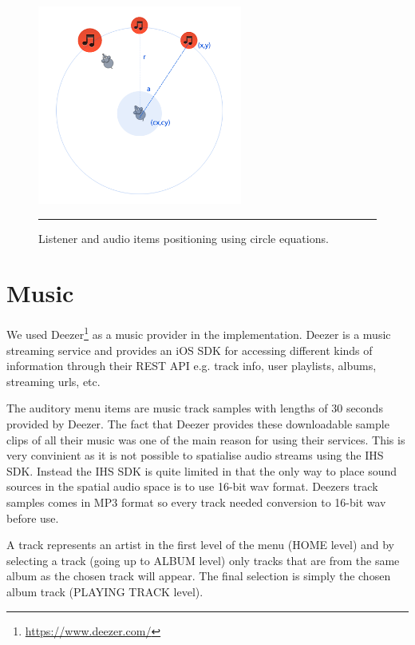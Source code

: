 \begin{figure}[t]
	\centering
		\includegraphics[width=0.6\textwidth,height=\textheight,keepaspectratio]{./Figures/circlepositions.png}
		\rule{35em}{1pt}
	\caption[Audio items positioning]{Listener and audio items positioning using circle equations.}
	\label{fig:circlepositions}
\end{figure}


\section{Music}
\label{sec:implementationmusic}
We used Deezer\footnote{\url{https://www.deezer.com/}} as a music provider in the implementation. Deezer is a music streaming service and provides an iOS SDK for accessing different kinds of information through their REST API e.g. track info, user playlists, albums, streaming urls, etc.

The auditory menu items are music track samples with lengths of 30 seconds provided by Deezer. The fact that Deezer provides these downloadable sample clips of all their music was one of the main reason for using their services. This is very convinient as it is not possible to spatialise audio streams using the IHS SDK. Instead the IHS SDK is quite limited in that the only way to place sound sources in the spatial audio space is to use 16-bit wav format. Deezers track samples comes in MP3 format so every track needed conversion to 16-bit wav before use.

A track represents an artist in the first level of the menu (HOME level) and by selecting a track (going up to ALBUM level) only tracks that are from the same album as the chosen track will appear. The final selection is simply the chosen album track (PLAYING TRACK level).


